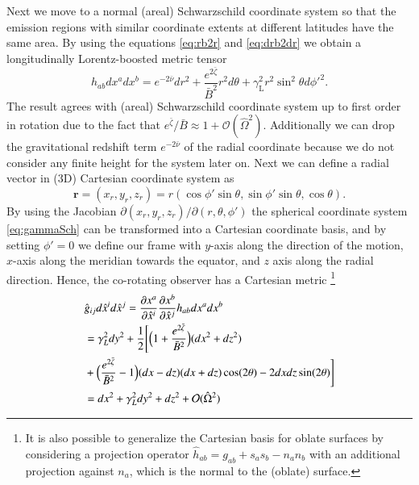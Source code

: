 \documentclass{aa}
\newcommand{\be}{\begin{equation}}
\newcommand{\ee}{\end{equation}}
\renewcommand{\vec}[1]{\ensuremath{\boldsymbol{#1}}}
\newcommand{\sch}{Schwarzschild }
\newcommand{\Ob}{\ensuremath{\hat{\Omega}}}
\newcommand{\nub}{\ensuremath{\bar{\nu}}}
\newcommand{\zetab}{\ensuremath{\bar{\zeta}}}
\newcommand{\Bb}{\ensuremath{\bar{B}}}
\newcommand{\lgamma}{\gamma_{\text{L}}}
\begin{document}
Next we move to a normal (areal) \sch coordinate system so that the emission regions with similar coordinate extents at different latitudes have the same area.
By using the equations \eqref{eq:rb2r} and \eqref{eq:drb2dr} we obtain a longitudinally Lorentz-boosted metric tensor 
\be \label{eq:gammaSch} 
h_{ab} dx^a dx^b = e^{-2\nub}dr^2 + \frac{e^{2\zetab}}{\Bb^2} r^2 d\theta + \lgamma^2 r^2 \sin^2\theta d{\phi'}^2.
\ee 
The result agrees with (areal) \sch coordinate system up to first order in rotation due to the fact that $e^{\zetab}/\Bb \approx 1 + \mathcal{O}(\Ob^2)$.  
Additionally we can drop the gravitational redshift term $e^{-2\nub}$ of the radial coordinate because we do not consider any finite height for the system later on.
Next we can define a radial vector in (3D) Cartesian coordinate system as 
\be
\vec{r} = (x_r, y_r, z_r) = r (\cos\phi' \sin\theta, \sin\phi' \sin\theta, \cos\theta).
\ee
By using the Jacobian $\partial(x_r, y_r, z_r)/\partial (r, \theta, \phi')$ the spherical coordinate system \eqref{eq:gammaSch} can be transformed into a Cartesian coordinate basis, and by setting $\phi'=0$ we define our frame with $y$-axis along the direction of the motion, $x$-axis along the meridian towards the equator, and $z$ axis along the radial direction.
Hence, the co-rotating observer has a Cartesian metric%
\footnote{ It is also possible to generalize the Cartesian basis for oblate surfaces by considering a projection operator $\hat{h}_{ab} = g_{ab} + s_a s_b - n_a n_b$ with an additional projection against $n_a$, which is the normal to the (oblate) surface.
}
\begin{align}\begin{split}
    & \hat{g}_{ij} d\hat{x}^i d\hat{x}^j = \frac{\partial x^a}{\partial \hat{x}^i} \frac{\partial x^b}{\partial \hat{x}^j} h_{ab} dx^a dx^b  \\
&= \gamma_L^2 dy^2 + \frac{1}{2} \Biggl[ \Bigl(1+ \frac{e^{2\zetab}}{\Bb^2}\Bigr)(dx^2 + dz^2) \\
&+ \Bigl(\frac{e^{2\zetab}}{\Bb^2} - 1\Bigr)(dx-dz)(dx + dz) \cos(2\theta) - 2dx dz \sin(2\theta) \Biggr] \\
& = dx^2 + \gamma_L^2 dy^2 + dz^2 + \mathcal{O}(\Ob^2)
\end{split}\end{align}
\end{document}
